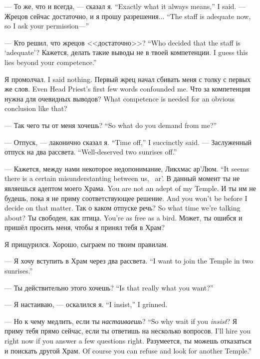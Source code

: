 {--- То же, что и всегда, --- сказал я.}
{``Exactly what it always means,'' I said.}
{--- Жрецов сейчас достаточно, и я прошу разрешения...}
{``The staff is adequate now, so I ask your permission---''}

{--- Кто решил, что жрецов <<достаточно>>?}
{``Who decided that the staff is `adequate'?}
{Кажется, делать такие выводы не в твоей компетенции.}
{I guess this lies beyond your competence.''}

{Я промолчал.}
{I said nothing.}
{Первый жрец начал сбивать меня с толку с первых же слов.}
{Even Head Priest's first few words confounded me.}
{Что за компетенция нужна для очевидных выводов?}
{What competence is needed for an obvious conclusion like that?}

{--- Так чего ты от меня хочешь?}
{``So what do you demand from me?''}

{--- Отпуск, --- лаконично сказал я.}
{``Time off,'' I succinctly said.}
{--- Заслуженный отпуск на два рассвета.}
{``Well-deserved two sunrises off.''}

{--- Кажется, между нами некоторое недопонимание, Ликхмас ар'Люм.}
{``It seems there is a certain misunderstanting between us, \Likchmas\ ar'\Loem.}
{В данный момент ты не являешься адептом моего Храма.}
{You are not an adept of my Temple.}
{И ты им не будешь, пока я не приму соответствующее решение.}
{And you won't be before I decide on that matter.}
{Так о каком отпуске речь?}
{So what time we're talking about?}
{Ты свободен, как птица.}
{You're as free as a bird.}
Может, ты ошибся и пришёл просить меня, чтобы я принял тебя в Храм?

Я прищурился.
Хорошо, сыграем по твоим правилам.

{--- Я хочу вступить в Храм через два рассвета.}
{``I want to join the Temple in two sunrises.''}

{--- Ты действительно этого хочешь?}
{``Is that really what you want?''}

{--- Я настаиваю, --- оскалился я.}
{``I insist,'' I grinned.}

{--- Но к чему медлить, если ты \emph{настаиваешь}?}
{``So why wait if you \emph{insist}?}
{Я приму тебя прямо сейчас, если ты ответишь на несколько вопросов.}
{I'll hire you right now if you answer a few questions right.}
{Разумеется, ты можешь отказаться и поискать другой Храм.}
{Of course you can refuse and look for another Temple.''}

